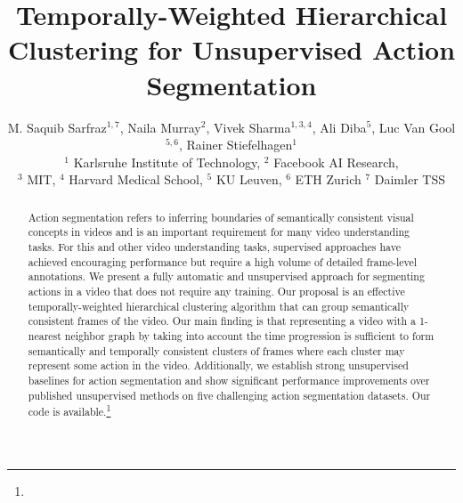 \documentclass[10pt,twocolumn,letterpaper]{article}
\begin{document}
\iffalse
\title{Unsupervised Temporal Segmentation via Time-weighted Clustering}
\title{Unsupervised Segmentation of Complex Activities in Videos with Hierarchical Time-weighted Clustering}
\title{Unsupervised Segmentation of Actions in Untrimmed Videos with Hierarchical Time-weighted Clustering}
\title{Unsupervised Action Segmentation \& Alignment in Untrimmed Videos with Hierarchical Time-weighted Clustering}
\title{Unsupervised Action Segmentation in Untrimmed Videos with Hierarchical Time-weighted Clustering}
\title{Unsupervised Temporal Segmentation of Actions in Untrimmed Videos with Hierarchical Time-weighted Clustering}
\title{Hierarchical Time-weighted Clustering for Unsupervised Action Segmentation}
\fi
\title{Temporally-Weighted Hierarchical Clustering for Unsupervised Action Segmentation}


\author{M. Saquib Sarfraz$^{1,7}$,  Naila Murray$^{2}$, Vivek Sharma$^{1,3,4}$, Ali Diba$^{5}$,  Luc Van Gool$^{5,6}$, Rainer Stiefelhagen$^{1}$ \\
\small{$^{1}$ Karlsruhe Institute of Technology,
$^{2}$ Facebook AI Research,}\\
\small{$^{3}$ MIT,
$^{4}$ Harvard Medical School,
$^{5}$ KU Leuven,
$^{6}$ ETH Zurich
$^{7}$ Daimler TSS}
}
\maketitle


\begin{abstract}
 Action segmentation refers to inferring boundaries of semantically consistent visual concepts in videos and is an important requirement for many video understanding tasks. 
 For this and other video understanding tasks, supervised approaches have achieved encouraging performance but require a high volume of detailed frame-level annotations. We present a fully automatic and unsupervised approach for segmenting actions in a video that does not require any training. Our proposal is an effective temporally-weighted hierarchical clustering algorithm that can group semantically consistent frames of the video. Our main finding is that representing a video with a 1-nearest neighbor graph by taking into account the time progression is sufficient to form semantically and temporally consistent clusters of frames where each cluster may represent some action in the video. Additionally, we establish strong unsupervised baselines for action segmentation and show significant performance improvements over published unsupervised methods on five challenging action segmentation datasets.
Our code is available.\footnote{}
 


\end{abstract}
\end{document}
